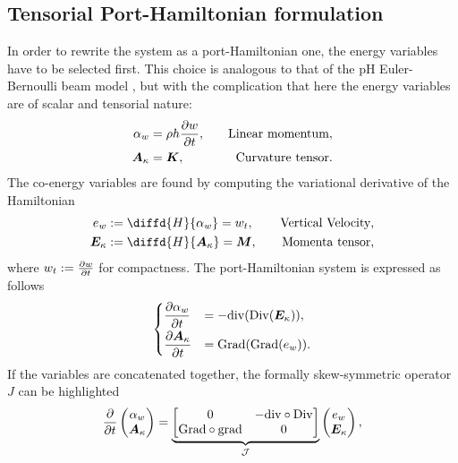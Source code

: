 \documentclass[letterpaper, 10 pt, conference]{ieeeconf}
\begin{document}
\subsection{Tensorial Port-Hamiltonian formulation}
In order to rewrite the system as a port-Hamiltonian one, the energy variables have to be selected first. This  choice is analogous to that of the pH Euler-Bernoulli beam  model \cite{BrugnoliKir}, but with the complication that here the energy variables are of scalar and tensorial nature:
\begin{equation}
\begin{aligned}
\alpha_w &= \rho h \diffp{w}{t}, \quad &\text{Linear momentum}, \\
\bm{A}_{\kappa} &= \bm{K}, \quad &\text{Curvature tensor}.\\
\end{aligned}
\end{equation}
The co-energy variables are found by computing the variational derivative of the Hamiltonian
\begin{equation}
\begin{aligned}
e_w &:= \diffd{H}{\alpha_w} = w_t, \quad &\text{Vertical Velocity}, \\
\bm{E}_{\kappa} &:= \diffd{H}{\bm{A}_{\kappa}} = \bm{M}, \quad &\text{Momenta tensor},\\
\end{aligned} 
\end{equation}
where $w_t := \diffp{w}{t}$ for compactness. The port-Hamiltonian system is expressed as follows 
\begin{equation}
\begin{cases}
\displaystyle\diffp{\alpha_w}{t} &= -\mathrm{div}(\mathrm{Div}(\bm{E}_{\kappa})), \vspace{1mm} \\
\displaystyle\diffp{\bm{A}_\kappa}{t} &= \mathrm{Grad}(\mathrm{Grad}(e_w)).
\end{cases}
\end{equation}
If the variables are concatenated together, the formally skew-symmetric operator $J$ can be highlighted 
\begin{equation}
\label{eq:PH_sys_Kir_Ten}
\diffp{}{t}
\begin{pmatrix}
\alpha_w \\
\bm{A}_\kappa \\
\end{pmatrix} = 
\underbrace{\begin{bmatrix}
	0  & -\mathrm{div} \circ \mathrm{Div} \\
	\mathrm{Grad} \circ \mathrm{grad}  & 0 \\
	\end{bmatrix}}_{\mathcal{J}}
\begin{pmatrix}
e_w \\
\bm{E}_{\kappa} \\
\end{pmatrix},
\end{equation}
\end{document}
